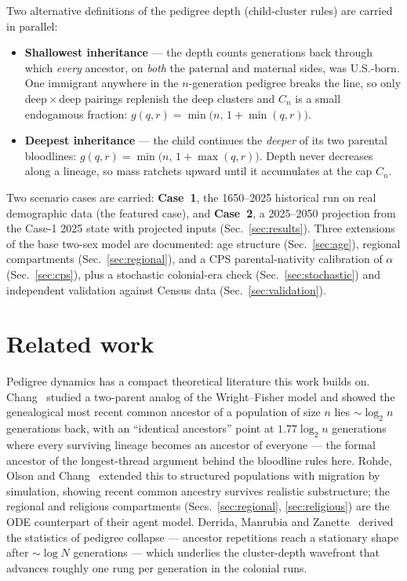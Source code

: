 \documentclass[11pt,a4paper]{article}
\begin{document}
Two alternative definitions of the pedigree depth (child-cluster rules) are
carried in parallel:
\begin{itemize}
  \item \textbf{Shallowest inheritance} --- the depth counts generations back through
    which \emph{every} ancestor, on \emph{both} the paternal and maternal
    sides, was U.S.-born.  One immigrant anywhere in the $n$-generation
    pedigree breaks the line, so only deep${}\times{}$deep pairings replenish
    the deep clusters and $C_n$ is a small endogamous fraction:
    $g(q,r)=\min\bigl(n,\,1+\min(q,r)\bigr)$.
  \item \textbf{Deepest inheritance} --- the child continues the \emph{deeper}
    of its two parental bloodlines:
    $g(q,r)=\min\bigl(n,\,1+\max(q,r)\bigr)$.  Depth never decreases along a
    lineage, so mass ratchets upward until it accumulates at the cap $C_n$.
\end{itemize}
Two scenario cases are carried: \textbf{Case~1}, the 1650--2025 historical
run on real demographic data (the featured case), and \textbf{Case~2}, a
2025--2050 projection from the Case-1 2025 state with projected inputs
(Sec.~\ref{sec:results}).  Three extensions of the base two-sex model are
documented: age structure (Sec.~\ref{sec:age}), regional compartments
(Sec.~\ref{sec:regional}), and a CPS parental-nativity calibration of
$\alpha$ (Sec.~\ref{sec:cps}), plus a stochastic colonial-era check
(Sec.~\ref{sec:stochastic}) and independent validation against Census
data (Sec.~\ref{sec:validation}).

\section{Related work}
Pedigree dynamics has a compact theoretical literature this work builds on.
Chang~\cite{chang1999} studied a two-parent analog of the Wright--Fisher model
and showed the genealogical most recent common ancestor of a population of
size $n$ lies $\sim\!\log_2 n$ generations back, with an ``identical ancestors''
point at $1.77\log_2 n$ generations where every surviving lineage becomes an
ancestor of everyone --- the formal ancestor of the longest-thread argument
behind the bloodline rules here.  Rohde, Olson and Chang~\cite{rohde2004}
extended this to structured populations with migration by simulation, showing
recent common ancestry survives realistic substructure; the regional and
religious compartments (Secs.~\ref{sec:regional}, \ref{sec:religious}) are
the ODE counterpart of their agent model.  Derrida, Manrubia and
Zanette~\cite{derrida1999,derrida2000} derived the statistics of pedigree
collapse --- ancestor repetitions reach a stationary shape after
$\sim\!\log N$ generations --- which underlies the cluster-depth wavefront
that advances roughly one rung per generation in the colonial runs.
\end{document}
